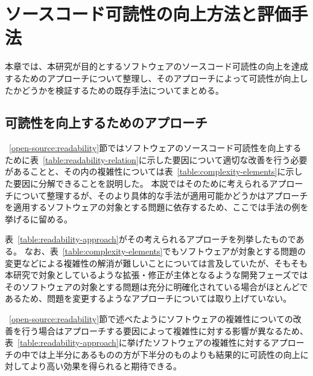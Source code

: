 \chapter{ソースコード可読性の向上方法と評価手法}
\label{readability}

本章では、本研究が目的とするソフトウェアのソースコード可読性の向上を達成するためのアプローチについて整理し、そのアプローチによって可読性が向上したかどうかを検証するための既存手法についてまとめる。

\section{可読性を向上するためのアプローチ}
\label{readability:approach}

~\ref{open-source:readability}節ではソフトウェアのソースコード可読性を向上するために表~\ref{table:readability-relation}に示した要因について適切な改善を行う必要があることと、その内の複雑性については表~\ref{table:complexity-elements}に示した要因に分解できることを説明した。
本説ではそのために考えられるアプローチについて整理するが、そのより具体的な手法が適用可能かどうかはアプローチを適用するソフトウェアの対象とする問題に依存するため、ここでは手法の例を挙げるに留める。

表~\ref{table:readability-approach}がその考えられるアプローチを列挙したものである。
なお、表~\ref{table:complexity-elements}でもソフトウェアが対象とする問題の変更などによる複雑性の解消が難しいことについては言及していたが、そもそも本研究で対象としているような拡張・修正が主体となるような開発フェーズではそのソフトウェアの対象とする問題は充分に明確化されている場合がほとんどであるため、問題を変更するようなアプローチについては取り上げていない。

~\ref{open-source:readability}節で述べたようにソフトウェアの複雑性についての改善を行う場合はアプローチする要因によって複雑性に対する影響が異なるため、表~\ref{table:readability-approach}に挙げたソフトウェアの複雑性に対するアプローチの中では上半分にあるものの方が下半分のものよりも結果的に可読性の向上に対してより高い効果を得られると期待できる。

